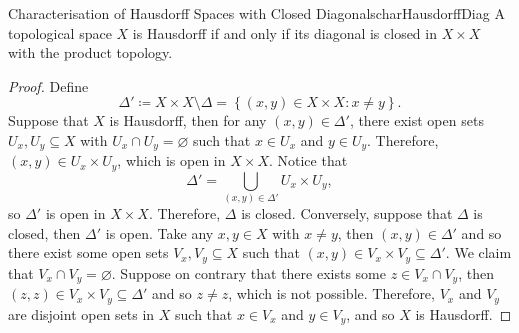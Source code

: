 \documentclass[math]{amznotes}
\theoremstyle{remark}
\begin{document}
\begin{probox}{Characterisation of Hausdorff Spaces with Closed Diagonals}{charHausdorffDiag}
    A topological space $X$ is Hausdorff if and only if its diagonal is closed in $X \times X$ with the product topology.
    \tcblower
    \begin{proof}
        Define 
        \begin{equation*}
            \Delta' \coloneqq X \times X \setminus \Delta = \left\{\left(x, y\right) \in X \times X \colon x \neq y\right\}.
        \end{equation*}
        Suppose that $X$ is Hausdorff, then for any $\left(x, y\right) \in \Delta'$, there exist open sets $U_x, U_y \subseteq X$ with $U_x \cap U_y = \varnothing$ such that $x \in U_x$ and $y \in U_y$. Therefore, $\left(x, y\right) \in U_x \times U_y$, which is open in $X \times X$. Notice that 
        \begin{equation*}
            \Delta' = \bigcup_{\left(x, y\right) \in \Delta'}U_x \times U_y,
        \end{equation*}
        so $\Delta'$ is open in $X \times X$. Therefore, $\Delta$ is closed. Conversely, suppose that $\Delta$ is closed, then $\Delta'$ is open. Take any $x, y \in X$ with $x \neq y$, then $\left(x, y\right) \in \Delta'$ and so there exist some open sets $V_x, V_y \subseteq X$ such that $\left(x, y\right) \in V_x \times V_y \subseteq \Delta'$. We claim that $V_x \cap V_y = \varnothing$. Suppose on contrary that there exists some $z \in V_x \cap V_y$, then $\left(z, z\right) \in V_x \times V_y \subseteq \Delta'$ and so $z \neq z$, which is not possible. Therefore, $V_x$ and $V_y$ are disjoint open sets in $X$ such that $x \in V_x$ and $y \in V_y$, and so $X$ is Hausdorff.
    \end{proof}
\end{probox}
\end{document}
